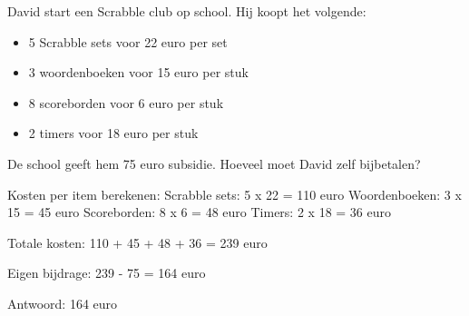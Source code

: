 \begin{opgave}
David start een Scrabble club op school. Hij koopt het volgende:
\begin{itemize}
\item 5 Scrabble sets voor 22 euro per set
\item 3 woordenboeken voor 15 euro per stuk
\item 8 scoreborden voor 6 euro per stuk  
\item 2 timers voor 18 euro per stuk
\end{itemize}
De school geeft hem 75 euro subsidie. Hoeveel moet David zelf bijbetalen?
\end{opgave}

\begin{oplossing}
Kosten per item berekenen:
Scrabble sets: 5 x 22 = 110 euro
Woordenboeken: 3 x 15 = 45 euro
Scoreborden: 8 x 6 = 48 euro
Timers: 2 x 18 = 36 euro

Totale kosten:
110 + 45 + 48 + 36 = 239 euro

Eigen bijdrage:
239 - 75 = 164 euro

Antwoord: 164 euro
\end{oplossing}